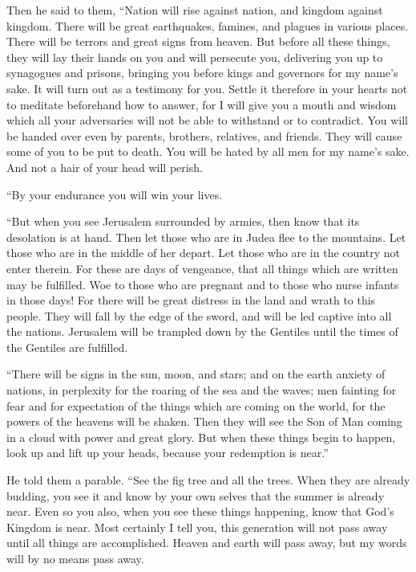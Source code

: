  Then he said to them, ``Nation will rise against nation,
and kingdom against kingdom.  There will be great
earthquakes, famines, and plagues in various places. There will be
terrors and great signs from heaven.  But before all these
things, they will lay their hands on you and will persecute you,
delivering you up to synagogues and prisons, bringing you before kings
and governors for my name's sake.  It will turn out as a
testimony for you.  Settle it therefore in your hearts not
to meditate beforehand how to answer,  for I will give you
a mouth and wisdom which all your adversaries will not be able to
withstand or to contradict.  You will be handed over even
by parents, brothers, relatives, and friends. They will cause some of
you to be put to death.  You will be hated by all men for
my name's sake.  And not a hair of your head will perish.

 ``By your endurance you will win your lives.

 ``But when you see Jerusalem surrounded by armies, then
know that its desolation is at hand.  Then let those who
are in Judea flee to the mountains. Let those who are in the middle of
her depart. Let those who are in the country not enter therein.
 For these are days of vengeance, that all things which are
written may be fulfilled.  Woe to those who are pregnant
and to those who nurse infants in those days! For there will be great
distress in the land and wrath to this people.  They will
fall by the edge of the sword, and will be led captive into all the
nations. Jerusalem will be trampled down by the Gentiles until the times
of the Gentiles are fulfilled.

 ``There will be signs in the sun, moon, and stars; and on
the earth anxiety of nations, in perplexity for the roaring of the sea
and the waves;  men fainting for fear and for expectation
of the things which are coming on the world, for the powers of the
heavens will be shaken.  Then they will see the Son of Man
coming in a cloud with power and great glory.  But when
these things begin to happen, look up and lift up your heads, because
your redemption is near.''

 He told them a parable. ``See the fig tree and all the
trees.  When they are already budding, you see it and know
by your own selves that the summer is already near.  Even
so you also, when you see these things happening, know that God's
Kingdom is near.  Most certainly I tell you, this
generation will not pass away until all things are accomplished.
 Heaven and earth will pass away, but my words will by no
means pass away.

